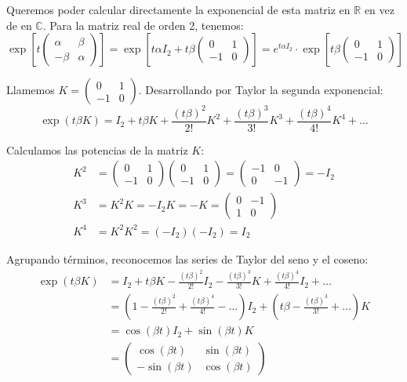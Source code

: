 Queremos poder calcular directamente la exponencial de esta matriz en $\mathbb{R}$ en vez de en $\mathbb{C}$. Para la matriz real de orden 2, tenemos:
\[
    \exp \left[ t \begin{pmatrix} \alpha & \beta \\ -\beta & \alpha \end{pmatrix} \right] = \exp \left[ t\alpha I_2 + t\beta \begin{pmatrix} 0 & 1 \\ -1 & 0 \end{pmatrix} \right] = e^{t\alpha I_2} \cdot \exp \left[ t\beta \begin{pmatrix} 0 & 1 \\ -1 & 0 \end{pmatrix} \right]
\]

Llamemos $K = \begin{pmatrix} 0 & 1 \\ -1 & 0 \end{pmatrix}$. Desarrollando por Taylor la segunda exponencial:
\[
    \exp(t\beta K) = I_2 + t\beta K + \frac{(t\beta)^2}{2!} K^2 + \frac{(t\beta)^3}{3!} K^3 + \frac{(t\beta)^4}{4!} K^4 + \dots
\]

Calculamos las potencias de la matriz $K$:
\begin{align*}
    K^2 &= \begin{pmatrix} 0 & 1 \\ -1 & 0 \end{pmatrix} \begin{pmatrix} 0 & 1 \\ -1 & 0 \end{pmatrix} = \begin{pmatrix} -1 & 0 \\ 0 & -1 \end{pmatrix} = -I_2 \\
    K^3 &= K^2 K = -I_2 K = -K = \begin{pmatrix} 0 & -1 \\ 1 & 0 \end{pmatrix} \\
    K^4 &= K^2 K^2 = (-I_2)(-I_2) = I_2
\end{align*}

Agrupando términos, reconocemos las series de Taylor del seno y el coseno:
\begin{align*}
    \exp(t\beta K) &= I_2 + t\beta K - \frac{(t\beta)^2}{2!} I_2 - \frac{(t\beta)^3}{3!} K + \frac{(t\beta)^4}{4!} I_2 + \dots \\
    &= \left( 1 - \frac{(t\beta)^2}{2!} + \frac{(t\beta)^4}{4!} - \dots \right) I_2 + \left( t\beta - \frac{(t\beta)^3}{3!} + \dots \right) K \\
    &= \cos(\beta t) I_2 + \sin(\beta t) K \\
    &= \begin{pmatrix} \cos(\beta t) & \sin(\beta t) \\ -\sin(\beta t) & \cos(\beta t) \end{pmatrix}
\end{align*}


